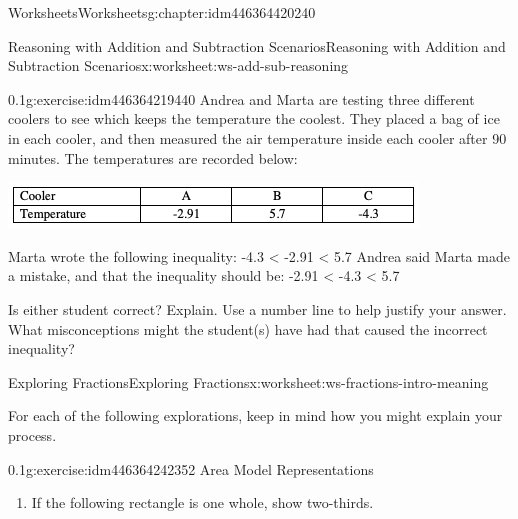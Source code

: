 \documentclass[twoside,11pt,]{book}
\begin{document}
\begin{chapterptx}{Worksheets}{}{Worksheets}{}{}{g:chapter:idm446364420240}
\begin{worksheet-section-numberless}{Reasoning with Addition and Subtraction Scenarios}{}{Reasoning with Addition and Subtraction Scenarios}{}{}{x:worksheet:ws-add-sub-reasoning}
\clearpage
\begin{divisionexercise}{6}{}{0.1}{g:exercise:idm446364219440}%
Andrea and Marta are testing three different coolers to see which keeps the temperature the coolest.  They placed a bag of ice in each cooler, and then measured the air temperature inside each cooler after 90 minutes.  The temperatures are recorded below:%
\begin{image}{0}{1}{0}%
\includegraphics[width=1\linewidth]{images/reasoning-table-cooler.png}
\end{image}%
Marta wrote the following inequality: -4.3 \textless{}  -2.91 \textless{} 5.7 Andrea said Marta made a mistake, and that the inequality should be: -2.91 \textless{} -4.3 \textless{} 5.7%
\par
Is either student correct?  Explain.  Use a number line to help justify your answer.  What misconceptions might the student(s) have had that caused the incorrect inequality?%
\end{divisionexercise}%
\end{worksheet-section-numberless}
\restoregeometry
%
%
\typeout{************************************************}
\typeout{************************************************}
%
\begin{worksheet-section-numberless}{Exploring Fractions}{}{Exploring Fractions}{}{}{x:worksheet:ws-fractions-intro-meaning}
\begin{introduction}{}%
For each of the following explorations, keep in mind how you might explain your process.%
\end{introduction}%
\begin{divisionexercise}{1}{}{0.1}{g:exercise:idm446364242352}%
Area Model Representations%
%
\begin{enumerate}[label=(\alph*)]
\item{}If the following rectangle is one whole, show two-thirds. \begin{sidebyside}{1}{0.3}{0.3}{0}%
\begin{sbspanel}{0.4}%

\end{sbspanel}
\end{sidebyside}
\end{enumerate}
\end{divisionexercise}
\end{worksheet-section-numberless}
\end{chapterptx}
\end{document}
